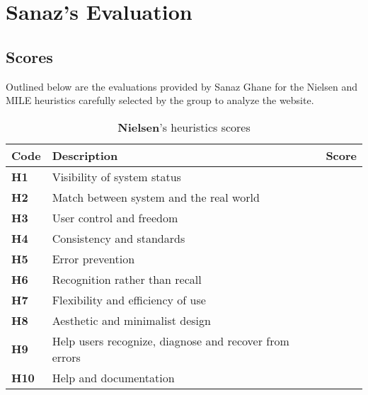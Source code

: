 
\section{Sanaz's Evaluation}
\subsection{Scores}
Outlined below are the evaluations provided by Sanaz Ghane for the Nielsen and MILE heuristics carefully selected by the group to analyze the website.\\
\begin{table}[htp!]
    \centering
    \begin{tabular}{ |l|l|c| }
        \hline
        \textbf{Code} & \textbf{Description} & \textbf{Score}\\
        \hline
        \textbf{H1} & Visibility of system status & \textbf{\color{unicefOrange}{3.5}}\\
        \hline
        \textbf{H2} & Match between system and the real world & \textbf{\color{unicefGreen}{4}}\\
        \hline
        \textbf{H3} & User control and freedom & \textbf{\color{unicefOrange}{4}}\\
        \hline
        \textbf{H4} & Consistency and standards & \textbf{\color{unicefGreen}{4}}\\
        \hline
        \textbf{H5} & Error prevention & \textbf{\color{unicefGreen}{4.5}}\\
        \hline
        \textbf{H6} & Recognition rather than recall & \textbf{\color{unicefGreen}{4.5}}\\
        \hline
        \textbf{H7} & Flexibility and efficiency of use & \textbf{\color{unicefOrange}{3.5}}\\
        \hline
        \textbf{H8} & Aesthetic and minimalist design & \textbf{\color{unicefGreen}{4}}\\
        \hline
        \textbf{H9} & Help users recognize, diagnose and recover from errors & \textbf{\color{unicefGreen}{4.5}}\\
        \hline
        \textbf{H10} & Help and documentation & \textbf{\color{unicefGreen}{4}}\\
        \hline
    \end{tabular}
    \caption{\textbf{Nielsen}'s heuristics scores}
\end{table}
